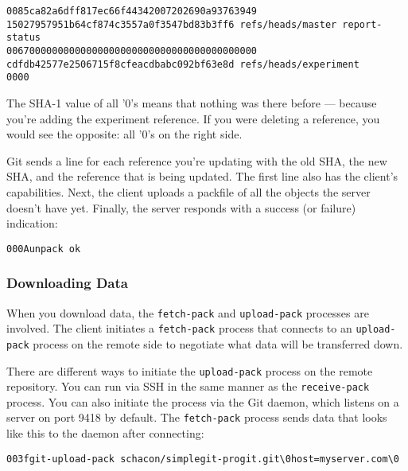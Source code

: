 \documentclass[a4paper]{book}
\begin{document}
\begin{shaded}\begin{verbatim}
0085ca82a6dff817ec66f44342007202690a93763949  15027957951b64cf874c3557a0f3547bd83b3ff6 refs/heads/master report-status
00670000000000000000000000000000000000000000 cdfdb42577e2506715f8cfeacdbabc092bf63e8d refs/heads/experiment
0000
\end{verbatim}\end{shaded}

The SHA-1 value of all '0's means that nothing was there before --- because you're adding the experiment reference. If you were deleting a reference, you would see the opposite: all '0's on the right side.

Git sends a line for each reference you're updating with the old SHA, the new SHA, and the reference that is being updated. The first line also has the client's capabilities. Next, the client uploads a packfile of all the objects the server doesn't have yet. Finally, the server responds with a success (or failure) indication:

\begin{shaded}\begin{verbatim}
000Aunpack ok
\end{verbatim}\end{shaded}

\subsubsection{Downloading Data}

When you download data, the \texttt{fetch-pack} and \texttt{upload-pack} processes are involved. The client initiates a \texttt{fetch-pack} process that connects to an \texttt{upload-pack} process on the remote side to negotiate what data will be transferred down.

There are different ways to initiate the \texttt{upload-pack} process on the remote repository. You can run via SSH in the same manner as the \texttt{receive-pack} process. You can also initiate the process via the Git daemon, which listens on a server on port 9418 by default. The \texttt{fetch-pack} process sends data that looks like this to the daemon after connecting:

\begin{shaded}\begin{verbatim}
003fgit-upload-pack schacon/simplegit-progit.git\0host=myserver.com\0
\end{verbatim}\end{shaded}
\end{document}

